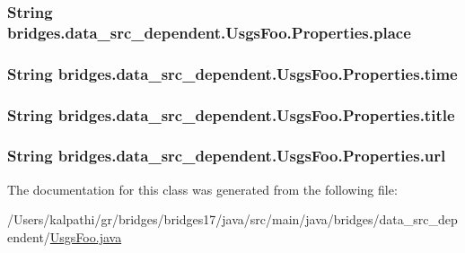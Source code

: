 \subsubsection[{place}]{\setlength{\rightskip}{0pt plus 5cm}String bridges.\+data\+\_\+src\+\_\+dependent.\+Usgs\+Foo.\+Properties.\+place}\label{classbridges_1_1data__src__dependent_1_1_usgs_foo_1_1_properties_a78104fd6df6eec29b1598669127df9ed}
\hypertarget{classbridges_1_1data__src__dependent_1_1_usgs_foo_1_1_properties_a6e42210e723e44d15bcea954ccd6b579}{}
\subsubsection[{time}]{\setlength{\rightskip}{0pt plus 5cm}String bridges.\+data\+\_\+src\+\_\+dependent.\+Usgs\+Foo.\+Properties.\+time}\label{classbridges_1_1data__src__dependent_1_1_usgs_foo_1_1_properties_a6e42210e723e44d15bcea954ccd6b579}
\hypertarget{classbridges_1_1data__src__dependent_1_1_usgs_foo_1_1_properties_a8ffe112286f04d57850831222e1c50d6}{}
\subsubsection[{title}]{\setlength{\rightskip}{0pt plus 5cm}String bridges.\+data\+\_\+src\+\_\+dependent.\+Usgs\+Foo.\+Properties.\+title}\label{classbridges_1_1data__src__dependent_1_1_usgs_foo_1_1_properties_a8ffe112286f04d57850831222e1c50d6}
\hypertarget{classbridges_1_1data__src__dependent_1_1_usgs_foo_1_1_properties_a42e5d1f2c28c6708921861ed95aa5e5f}{}
\subsubsection[{url}]{\setlength{\rightskip}{0pt plus 5cm}String bridges.\+data\+\_\+src\+\_\+dependent.\+Usgs\+Foo.\+Properties.\+url}\label{classbridges_1_1data__src__dependent_1_1_usgs_foo_1_1_properties_a42e5d1f2c28c6708921861ed95aa5e5f}


The documentation for this class was generated from the following file\+:\begin{DoxyCompactItemize}
\item 
/\+Users/kalpathi/gr/bridges/bridges17/java/src/main/java/bridges/data\+\_\+src\+\_\+dependent/\hyperlink{_usgs_foo_8java}{Usgs\+Foo.\+java}\end{DoxyCompactItemize}
